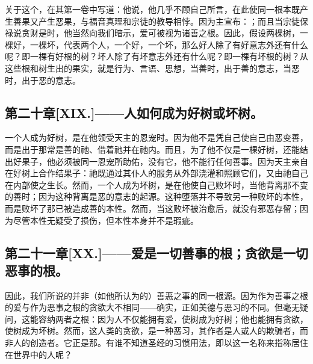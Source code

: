 关于这个，在其第一卷中写道：他说，他几乎不顾自己所言，在此使同一根本既产生善果又产生恶果，与福音真理和宗徒的教导相悖。因为主宣布：；而且当宗徒保禄说贪财是时，他当然向我们暗示，爱可被视为诸善之根。因此，假设两棵树，一棵好，一棵坏，代表两个人，一个好，一个坏，那么好人除了有好意志外还有什么呢？即一棵有好根的树？坏人除了有坏意志外还有什么呢？即一棵有坏根的树？从这些根和树生出的果实，就是行为、言语、思想，当善时，出于善的意志，当恶时，出于恶的意志。\par


\subsection{第二十章[XIX.]——人如何成为好树或坏树。}

一个人成为好树，是在他领受天主的恩宠时。因为他不是凭自己使自己由恶变善，而是出于那常是善的祂、借着祂并在祂内。而且，为了他不仅是一棵好树，还能结出好果子，他必须被同一恩宠所助佑，没有它，他不能行任何善事。因为天主亲自在好树上合作结果子：祂既通过其仆人的服务从外部浇灌和照顾它们，又由祂自己在内部使之生长。然而，一个人成为坏树，是在他使自己败坏时，当他背离那不变的善时；因为这种背离是恶的意志的起源。这种堕落并不导致另一种败坏的本性，而是败坏了那已被造成善的本性。然而，当这败坏被治愈后，就没有邪恶存留；因为尽管本性无疑受了损伤，但本性本身并不是瑕疵。\par


\subsection{第二十一章[XX.]——爱是一切善事的根；贪欲是一切恶事的根。}

因此，我们所说的并非（如他所认为的）善恶之事的同一根源。因为作为善事之根的爱与作为恶事之根的贪欲大不相同——确实，正如美德与恶习的不同。但毫无疑问，这能容纳两者之根：因为人不仅能拥有爱，使树成为好树；他也能拥有贪欲，使树成为坏树。然而，这人类的贪欲，是一种恶习，其作者是人或人的欺骗者，而非人的创造者。它正是那。有谁不知道圣经的习惯用法，即以这一名称来指称居住在世界中的人呢？\par

